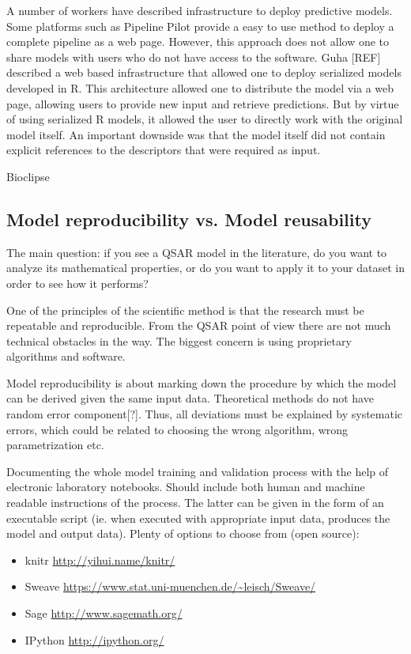 \documentclass[12pt,letterpaper]{article}
\begin{document}
A number of workers have described infrastructure to deploy predictive
models. Some platforms such as Pipeline Pilot provide a easy to use
method to deploy a complete pipeline as a web page. However, this
approach does not allow one to share models with users who do not have
access to the software. Guha [REF] described a web based
infrastructure that allowed one to deploy serialized models developed
in R. This architecture allowed one to distribute the model via a web
page, allowing users to provide new input and retrieve
predictions. But by virtue of using serialized R models, it allowed
the user to directly work with the original model itself. An important
downside was that the model itself did not contain explicit references
to the descriptors that were required as input. 

Bioclipse

\subsection{Model reproducibility vs. Model reusability}

The main question: if you see a QSAR model in the literature, do you
want to analyze its mathematical properties, or do you want to apply
it to your dataset in order to see how it performs?

One of the principles of the scientific method is that the research
must be repeatable and reproducible. From the QSAR point of view there
are not much technical obstacles in the way. The biggest concern is
using proprietary algorithms and software.

Model reproducibility is about marking down the procedure by which
the model can be derived given the same input data. Theoretical methods
do not have random error component[?]. Thus, all deviations must be
explained by systematic errors, which could be related to choosing the
wrong algorithm, wrong parametrization etc.

Documenting the whole model training and validation process with the
help of electronic laboratory notebooks. Should include both human and
machine readable instructions of the process. The latter can be given 
in the form of an executable script (ie. when executed with appropriate
input data, produces the model and output data). Plenty of options to
choose from (open source):
\begin{itemize}
  \item knitr \url{http://yihui.name/knitr/}
  \item Sweave \url{https://www.stat.uni-muenchen.de/~leisch/Sweave/}
  \item Sage \url{http://www.sagemath.org/}
  \item IPython \url{http://ipython.org/}
\end{itemize}
\end{document}
